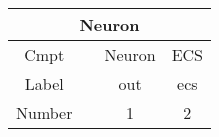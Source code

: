 \begin{tabular}{|c|c|c|c|}
	\multicolumn{4}{c}{Neuron}                                                                                   \\ \hline
	Cmpt   &                             & Neuron                                        & ECS                   \\ \hline
	Label  &                             & out                                           & ecs                   \\ \hline
	Number &                             & 1                                             & 2                     \\ \hline
\end{tabular}
